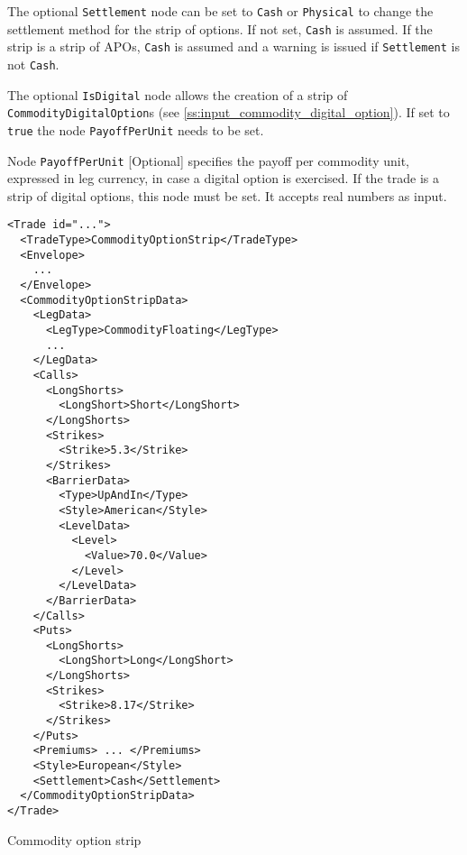 The optional \lstinline!Settlement! node can be set to \lstinline!Cash! or \lstinline!Physical! to change the settlement method for the strip of options. If not set, \lstinline!Cash! is assumed. If the strip is a strip of APOs, \lstinline!Cash! is assumed and a warning is issued if \lstinline!Settlement! is not \lstinline!Cash!.

The optional \lstinline!IsDigital! node allows the creation of a strip of \lstinline!CommodityDigitalOption!s (see \ref{ss:input_commodity_digital_option}). If set to \lstinline!true! the node \lstinline!PayoffPerUnit! needs to be set.

Node \lstinline!PayoffPerUnit! [Optional] specifies the payoff per commodity unit, expressed in leg currency, in case a digital option is exercised. If the trade is a strip of digital options, this node must be set. It accepts real numbers as input.

\begin{listing}[h!]
\begin{verbatim}
<Trade id="...">
  <TradeType>CommodityOptionStrip</TradeType>
  <Envelope>
    ...
  </Envelope>
  <CommodityOptionStripData>
    <LegData>
      <LegType>CommodityFloating</LegType>
      ...
    </LegData>
    <Calls>
      <LongShorts>
        <LongShort>Short</LongShort>
      </LongShorts>
      <Strikes>
        <Strike>5.3</Strike>
      </Strikes>
      <BarrierData>
        <Type>UpAndIn</Type>
        <Style>American</Style>
        <LevelData>
          <Level>
            <Value>70.0</Value>
          </Level>
        </LevelData>
      </BarrierData>
    </Calls>
    <Puts>
      <LongShorts>
        <LongShort>Long</LongShort>
      </LongShorts>
      <Strikes>
        <Strike>8.17</Strike>
      </Strikes>
    </Puts>
    <Premiums> ... </Premiums>
    <Style>European</Style>
    <Settlement>Cash</Settlement>
  </CommodityOptionStripData>
</Trade>
\end{verbatim}
\caption{Commodity option strip}
\label{lst:commodity_option_strip}
\end{listing}
